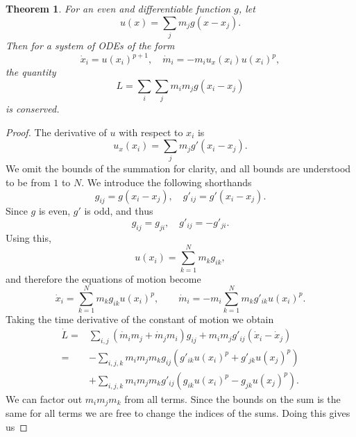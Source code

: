 \documentclass[english,master]{liumaiex}
\theoremstyle{thesisplain}
\newtheorem{theorem}[proposition]{Theorem}
\theoremstyle{thesisdefinition}
\numberwithin{equation}{section}
\begin{document}
\begin{theorem}
	For an even and differentiable function $g$, let
	\begin{equation}
		u(x) = \sum_{j} m_j g(x - x_j).
	\end{equation}
	Then for a system of ODEs of the form
	\begin{equation}
		\dot{x}_i = u(x_i)^{p+1},
		\quad
		\dot{m}_i = -m_i u_x(x_i) u(x_i)^p,
	\end{equation}
	the quantity
	\begin{equation}
		L = \sum_{i}\sum_{j} m_i m_j g(x_i - x_j)
	\end{equation}
	is conserved.
\end{theorem}
\begin{proof}
	The derivative of $u$ with respect to $x_i$ is
	\begin{equation}
		u_x(x_i) = \sum_j m_j g'(x_i - x_j).
	\end{equation}
	We omit the bounds of the summation for clarity, and all bounds are understood to be from $1$ to $N$. We introduce the following shorthands
	\begin{equation}
		g_{ij} = g(x_i - x_j), \quad
		g'_{ij} = g'(x_i - x_j).
	\end{equation}
	Since $g$ is even, $g'$ is odd, and thus
	\begin{equation}
		g_{ij} = g_{ji}, \quad g'_{ij} = -g'_{ji}.
	\end{equation}
	Using this,
	\begin{equation}
		u(x_i) = \sum_{k=1}^{N} m_k g_{ik},
	\end{equation}
	and therefore the equations of motion become
	\begin{equation}
		\dot{x}_i
		=
		\sum_{k=1}^{N} m_k g_{ik} u(x_i)^p,
		\qquad
		\dot{m}_i
		=
		-m_i \sum_{k=1}^{N} m_k g'_{ik} u(x_i)^p.
		\label{eq:ode-short}
	\end{equation}
	Taking the time derivative of the constant of motion we obtain
	\begin{equation}
	\begin{aligned}
		\dot{L}
		=& \sum_{i,j} (\dot{m}_i m_j + \dot{m}_j m_i) g_{ij} + m_i m_j g'_{ij} (\dot{x}_i - \dot{x}_j) \\
		=& - \sum_{i,j,k} m_i m_j m_k g_{ij} (g'_{ik} u(x_i)^p + g'_{jk} u(x_j)^p) \\
		&+ \sum_{i,j,k} m_i m_j m_k g'_{ij} (g_{ik} u(x_i)^p - g_{jk} u(x_j)^p).
	\end{aligned}
	\end{equation}
	We can factor out $m_i m_j m_k$ from all terms. Since the bounds on the sum is the same for all terms we are free to change the indices of the sums. Doing this gives us

\end{proof}
\end{document}
